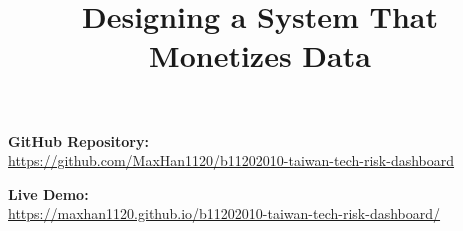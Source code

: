 ﻿\documentclass[a4paper,12pt]{article}
\title{Designing a System That Monetizes Data}
\begin{document}
\maketitle

\textbf{GitHub Repository:}\\
\url{https://github.com/MaxHan1120/b11202010-taiwan-tech-risk-dashboard}

\textbf{Live Demo:}\\
\url{https://maxhan1120.github.io/b11202010-taiwan-tech-risk-dashboard/}

\tableofcontents
\newpage














\begin{appendices}

\end{appendices}



\end{document}

